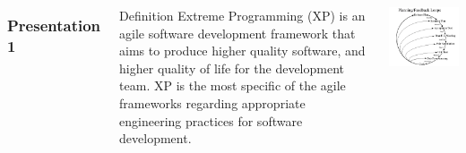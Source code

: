 \begin{frame}
    \begin{columns}

        \frametitle{Presentation 1}
        \begin{block}{Definition}
            Extreme Programming (XP) is an agile software development framework that aims to produce higher quality software, and higher quality of life for the development team. XP is the most specific of the agile frameworks regarding appropriate engineering practices for software development.\cite{alliance}
        \end{block}\pause
        \includegraphics[scale=0.25]{feedback.jpg}\cite{feedback}
    \end{columns}
\end{frame}